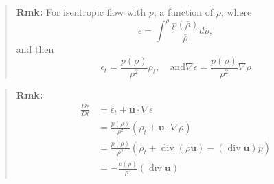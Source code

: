 \begin{quote}
	\textbf{Rmk:}
For isentropic flow with $p$, a function of $\rho$, where
\begin{equation}
\epsilon = \int^{\rho} \frac{p(\bar{\rho})}{\bar{\rho}}d\rho,
\end{equation}
and then
\begin{equation}
\epsilon_t = \frac{p(\rho)}{\rho^2}\rho_t,\quad\text{and}\nabla \epsilon = \frac{p(\rho)}{\rho^2}\nabla \rho
\end{equation}


\end{quote}

\begin{quote}
	\textbf{Rmk:}
\begin{equation}
\begin{aligned}
\frac{D\epsilon}{Dt}
&= \epsilon_t + \textbf{u}\cdot \nabla \epsilon\\
&= \frac{p(\rho)}{\rho^2} (\rho_t + \textbf{u}\cdot \nabla\rho)\\
&= \frac{p(\rho)}{\rho^2}\left(\rho_t + \operatorname{div}(\rho\textbf{u}) - (\operatorname{div}\textbf{u})p\right)\\
&= -\frac{p(\rho)}{\rho^2}\left(\operatorname{div}\textbf{u}\right)
\end{aligned}
\end{equation}

\end{quote}

